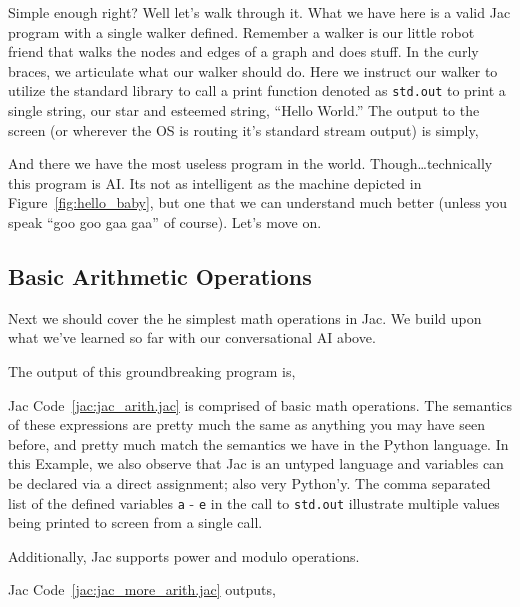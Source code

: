 
Simple enough right? Well let's walk through it. What we have here is a valid Jac program with a single walker defined. Remember a walker is our little robot friend that walks the nodes and edges of a graph and does stuff. In the curly braces, we articulate what our walker should do. Here we instruct our walker to utilize the standard library to call a print function denoted as \texttt{std.out} to print a single string, our star and esteemed string, ``Hello World.'' The output to the screen (or wherever the OS is routing it's standard stream output) is simply,


And there we have the most useless program in the world. Though\dots technically this program is AI. Its not as intelligent as the machine depicted in Figure~\ref{fig:hello_baby}, but one that we can understand much better (unless you speak ``\gls{goo goo gaa gaa}'' of course). Let's move on.

\subsection{Basic Arithmetic Operations}
Next we should cover the he simplest math operations in Jac. We build upon what we've learned so far with our conversational AI above.


The output of this groundbreaking program is,


Jac Code~\ref{jac:jac_arith.jac} is comprised of basic math operations. The semantics of these expressions are pretty much the same as anything you may have seen before, and pretty much match the semantics we have in the Python language. In this Example, we also observe that Jac is an untyped language and variables can be declared via a direct assignment; also very Python'y. The comma separated list of the defined variables \texttt{a} - \texttt{e} in the call to \texttt{std.out} illustrate multiple values being printed to screen from a single call.
\par
Additionally, Jac supports power and modulo operations.


Jac Code~\ref{jac:jac_more_arith.jac} outputs,

